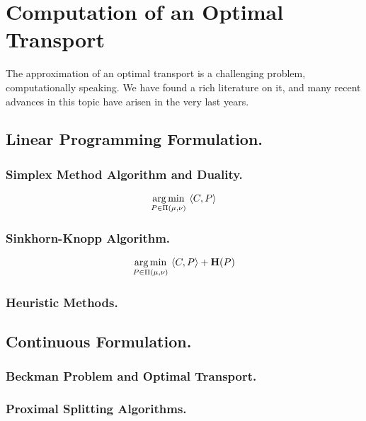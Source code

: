 \chapter{Computation of an Optimal Transport}
The approximation of an optimal transport is a challenging problem, computationally speaking. We have found a rich literature on it, and many recent advances in this topic have arisen in the very last years. 
\section{Linear Programming Formulation.}
\subsection{Simplex Method Algorithm and Duality.}
\begin{equation}
	\displaystyle {\underset {P\in \Pi(\mu, \nu)}{\operatorname {arg\,min} }}\ {\left\langle C, P \right\rangle}
\end{equation}
\subsection{Sinkhorn-Knopp Algorithm.}


\begin{equation}
	\displaystyle {\underset {P\in \Pi(\mu, \nu)}{\operatorname {arg\,min} }}\ {\left\langle C, P \right\rangle+\mathbf{H}(P)}
\end{equation}
	
\subsection{Heuristic Methods.}

\section{Continuous Formulation.}
\subsection{Beckman Problem and Optimal Transport.}
\subsection{Proximal Splitting Algorithms.}

